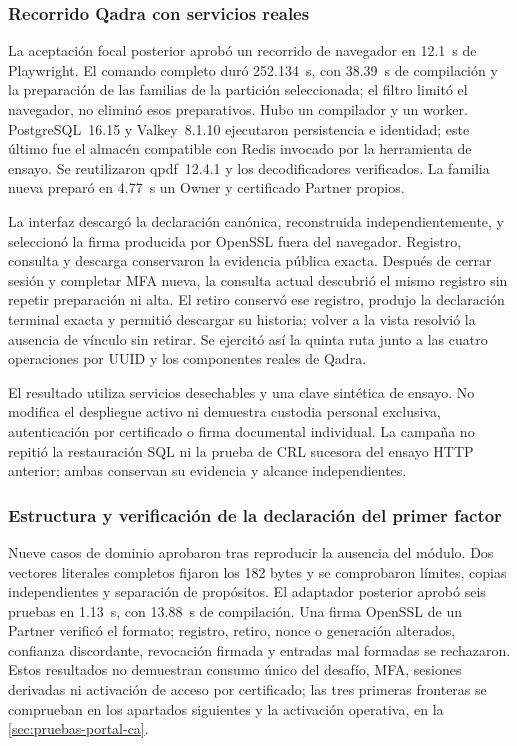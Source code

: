 \subsubsection{Recorrido Qadra con servicios reales}

La aceptación focal posterior aprobó un recorrido de navegador en 12.1~s de
Playwright. El comando completo duró 252.134~s, con 38.39~s de compilación y
la preparación de las familias de la partición seleccionada; el filtro limitó
el navegador, no eliminó esos preparativos. Hubo un compilador y un worker.
PostgreSQL~16.15 y Valkey~8.1.10 ejecutaron persistencia e identidad; este último
fue el almacén compatible con Redis invocado por la herramienta de ensayo. Se
reutilizaron qpdf~12.4.1 y los decodificadores verificados. La familia nueva
preparó en 4.77~s un Owner y certificado Partner propios.

La interfaz descargó la declaración canónica, reconstruida independientemente,
y seleccionó la firma producida por OpenSSL fuera del navegador. Registro,
consulta y descarga conservaron la evidencia pública exacta. Después de cerrar
sesión y completar MFA nueva, la consulta actual descubrió el mismo registro
sin repetir preparación ni alta. El retiro conservó ese registro, produjo la
declaración terminal exacta y permitió descargar su historia; volver a la vista
resolvió la ausencia de vínculo sin retirar. Se ejercitó así la quinta ruta
junto a las cuatro operaciones por UUID y los componentes reales de Qadra.

El resultado utiliza servicios desechables y una clave sintética de ensayo.
No modifica el despliegue activo ni demuestra custodia personal exclusiva,
autenticación por certificado o firma documental individual. La campaña no
repitió la restauración SQL ni la prueba de CRL sucesora del ensayo HTTP
anterior; ambas conservan su evidencia y alcance independientes.

\subsubsection{Estructura y verificación de la declaración del primer factor}

Nueve casos de dominio aprobaron tras reproducir la ausencia del módulo. Dos
vectores literales completos fijaron los 182 bytes y se comprobaron límites,
copias independientes y separación de propósitos. El adaptador posterior
aprobó seis pruebas en 1.13~s, con 13.88~s de compilación. Una firma OpenSSL de
un Partner verificó el formato; registro, retiro, nonce o generación alterados,
confianza discordante, revocación firmada y entradas mal formadas se rechazaron.
Estos resultados no demuestran consumo único del desafío, MFA, sesiones derivadas
ni activación de acceso por certificado; las tres primeras fronteras se comprueban
en los apartados siguientes y la activación operativa, en la
\cref{sec:pruebas-portal-ca}.


